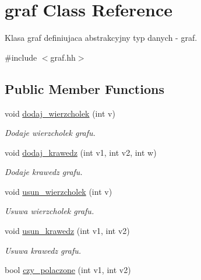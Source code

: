 \hypertarget{classgraf}{\section{graf \-Class \-Reference}
\label{classgraf}
}


\-Klasa graf definiujaca abstrakcyjny typ danych -\/ graf.  




{\ttfamily \#include $<$graf.\-hh$>$}

\subsection*{\-Public \-Member \-Functions}
\begin{DoxyCompactItemize}
\item 
\hypertarget{classgraf_a35100a3bdbd10cc6b910661a949810e6}{void \hyperlink{classgraf_a35100a3bdbd10cc6b910661a949810e6}{dodaj\-\_\-wierzcholek} (int v)}\label{classgraf_a35100a3bdbd10cc6b910661a949810e6}

\begin{DoxyCompactList}\small\item\em \-Dodaje wierzcholek grafu. \end{DoxyCompactList}\item 
\hypertarget{classgraf_adc5aa4ebf7a250bdc26e082d8e529acf}{void \hyperlink{classgraf_adc5aa4ebf7a250bdc26e082d8e529acf}{dodaj\-\_\-krawedz} (int v1, int v2, int w)}\label{classgraf_adc5aa4ebf7a250bdc26e082d8e529acf}

\begin{DoxyCompactList}\small\item\em \-Dodaje krawedz grafu. \end{DoxyCompactList}\item 
\hypertarget{classgraf_abe0ff8a414e519b22d80a637b6a1b7b9}{void \hyperlink{classgraf_abe0ff8a414e519b22d80a637b6a1b7b9}{usun\-\_\-wierzcholek} (int v)}\label{classgraf_abe0ff8a414e519b22d80a637b6a1b7b9}

\begin{DoxyCompactList}\small\item\em \-Usuwa wierzcholek grafu. \end{DoxyCompactList}\item 
\hypertarget{classgraf_a098650e7621b94ecff5e6be866b15b3f}{void \hyperlink{classgraf_a098650e7621b94ecff5e6be866b15b3f}{usun\-\_\-krawedz} (int v1, int v2)}\label{classgraf_a098650e7621b94ecff5e6be866b15b3f}

\begin{DoxyCompactList}\small\item\em \-Usuwa krawedz grafu. \end{DoxyCompactList}\item 
\hypertarget{classgraf_af6698c3f84ab5523ecd862c67d12500c}{bool \hyperlink{classgraf_af6698c3f84ab5523ecd862c67d12500c}{czy\-\_\-polaczone} (int v1, int v2)}\label{classgraf_af6698c3f84ab5523ecd862c67d12500c}


\end{DoxyCompactItemize}
